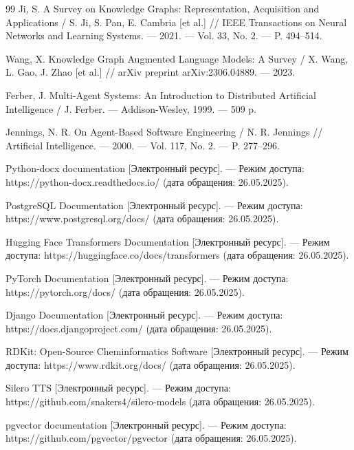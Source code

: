 \documentclass[a4paper,14pt]{extarticle}
\begin{document}
\begin{thebibliography}{99}
		 Ji, S. A Survey on Knowledge Graphs: Representation, Acquisition and Applications / S. Ji, S. Pan, E. Cambria [et al.] // IEEE Transactions on Neural Networks and Learning Systems. — 2021. — Vol. 33, No. 2. — P. 494–514.
		
		 Wang, X. Knowledge Graph Augmented Language Models: A Survey / X. Wang, L. Gao, J. Zhao [et al.] // arXiv preprint arXiv:2306.04889. — 2023.
		
		 Ferber, J. Multi-Agent Systems: An Introduction to Distributed Artificial Intelligence / J. Ferber. — Addison-Wesley, 1999. — 509 p.
		
		 Jennings, N. R. On Agent-Based Software Engineering / N. R. Jennings // Artificial Intelligence. — 2000. — Vol. 117, No. 2. — P. 277–296.
		
		 Python-docx documentation [Электронный ресурс]. — Режим доступа: https://python-docx.readthedocs.io/ (дата обращения: 26.05.2025).
		
		 PostgreSQL Documentation [Электронный ресурс]. — Режим доступа: https://www.postgresql.org/docs/ (дата обращения: 26.05.2025).
		
		 Hugging Face Transformers Documentation [Электронный ресурс]. — Режим доступа: https://huggingface.co/docs/transformers (дата обращения: 26.05.2025).
		
		 PyTorch Documentation [Электронный ресурс]. — Режим доступа: https://pytorch.org/docs/ (дата обращения: 26.05.2025).
		
		 Django Documentation [Электронный ресурс]. — Режим доступа: https://docs.djangoproject.com/ (дата обращения: 26.05.2025).
		
		 RDKit: Open-Source Cheminformatics Software [Электронный ресурс]. — Режим доступа: https://www.rdkit.org/docs/ (дата обращения: 26.05.2025).
		
		 Silero TTS [Электронный ресурс]. — Режим доступа: https://github.com/snakers4/silero-models (дата обращения: 26.05.2025).
		
		 pgvector documentation [Электронный ресурс]. — Режим доступа: https://github.com/pgvector/pgvector (дата обращения: 26.05.2025).
		
	\end{thebibliography}
	\newpage
	
\end{document}
